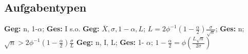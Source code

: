   \subsection{Aufgabentypen}
  \textbf{Geg: } n, 1-$ \alpha $; 
  \textbf{Ges: }I s.o.
  \textbf{Geg: }$ \overline{X}, \sigma, 1- \alpha, L $; 
  $ L = 2 \phi^{-1} ( 1-\frac{ \alpha }{2} ) \frac{\sigma}{ \sqrt{n} }$; 
  \textbf{Ges: }n; $ \sqrt{n} > 2\phi^{-1} ( 1- \frac{ \alpha}{2} )\frac{ \sigma }{L} $
  \textbf{Geg: }n, I, L; 
  \textbf{Ges: }1- $\alpha$; 
$ 1- \frac{ \alpha }{2} = \phi (\frac{ L \sqrt{n} }{ 2\sigma} ) $
  